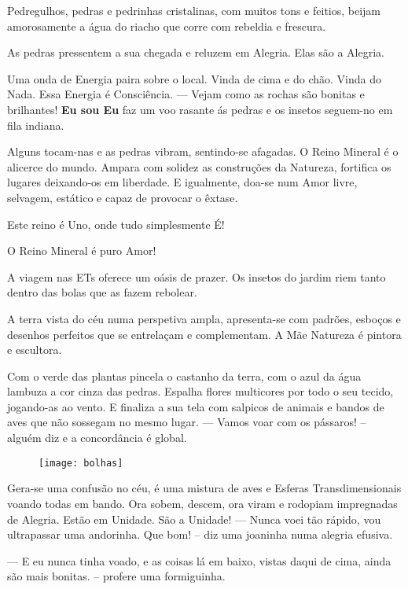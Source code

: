 Pedregulhos, pedras e pedrinhas cristalinas, com muitos tons e feitios, beijam amorosamente a água do riacho que corre com rebeldia e frescura.

As pedras pressentem a sua chegada e reluzem em Alegria. Elas são a Alegria.

Uma onda de Energia paira sobre o local. Vinda de cima e do chão. Vinda do Nada. Essa Energia é Consciência.
\bigbreak
— Vejam como as rochas são bonitas e brilhantes!
\bigbreak
\textbf{Eu sou Eu} faz um voo rasante ás pedras e os insetos seguem-no em fila indiana.

Alguns tocam-nas e as pedras vibram, sentindo-se afagadas.
\bigbreak
O Reino Mineral é o alicerce do mundo. Ampara com solidez as construções da Natureza, fortifica os lugares deixando-os em liberdade. E igualmente, doa-se num Amor livre, selvagem, estático e capaz de provocar o êxtase.

Este reino é Uno, onde tudo simplesmente É!

O Reino Mineral é puro Amor!

A viagem nas ETs oferece um oásis de prazer. Os insetos do jardim riem tanto dentro das bolas que as fazem rebolear.

A terra vista do céu numa perspetiva ampla, apresenta-se com padrões, esboços e desenhos perfeitos que se entrelaçam e complementam.
A Mãe Natureza é pintora e escultora.

Com o verde das plantas pincela o castanho da terra, com o azul da água lambuza a cor cinza das pedras. Espalha flores multicores por todo o seu tecido, jogando-as ao vento. E finaliza a sua tela com salpicos de animais e bandos de aves que não sossegam no mesmo lugar.
\bigbreak
— Vamos voar com os pássaros! – alguém diz e a concordância é global.
\bigbreak

\begin{figure}[h]
    \centering
    \texttt{[image: bolhas]}
\end{figure}

 Gera-se uma confusão no céu, é uma mistura de aves e Esferas Transdimensionais voando todas em bando. Ora sobem, descem, ora viram e rodopiam impregnadas de Alegria. Estão em Unidade. São a Unidade!
 \bigbreak
— Nunca voei tão rápido, vou ultrapassar uma andorinha. Que bom! – diz uma joaninha numa alegria efusiva.

— E eu nunca tinha voado, e as coisas lá em baixo, vistas daqui de cima, ainda são mais bonitas. – profere uma formiguinha.

